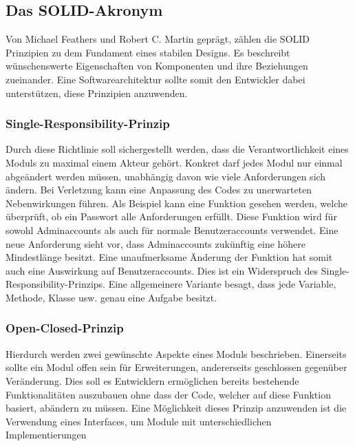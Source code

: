 \documentclass[conference]{IEEEtran}
\begin{document}
\subsection{Das SOLID-Akronym}

Von Michael Feathers und Robert C. Martin geprägt, zählen die SOLID Prinzipien zu dem Fundament eines stabilen Designs. Es beschreibt wünschenswerte Eigenschaften von Komponenten und ihre Beziehungen zueinander. Eine Softwarearchitektur sollte somit den Entwickler dabei unterstützen, diese Prinzipien anzuwenden. 

\subsubsection{Single-Responsibility-Prinzip} Durch diese Richtlinie soll sichergestellt werden, dass die Verantwortlichkeit eines Moduls zu maximal einem Akteur gehört. Konkret darf jedes Modul nur einmal abgeändert werden müssen, unabhängig davon wie viele Anforderungen sich ändern. Bei Verletzung kann eine Anpassung des Codes zu unerwarteten Nebenwirkungen führen. Als Beispiel kann eine Funktion gesehen werden, welche überprüft, ob ein Passwort alle Anforderungen erfüllt. Diese Funktion wird für sowohl Adminaccounts als auch für normale Benutzeraccounts verwendet. Eine neue Anforderung sieht vor, dass Adminaccounts zukünftig eine höhere Mindestlänge besitzt. Eine unaufmerksame Änderung der Funktion hat somit auch eine Auswirkung auf Benutzeraccounts. Dies ist ein Widerspruch des Single-Responsibility-Prinzips. Eine allgemeinere Variante besagt, dass jede Variable, Methode, Klasse usw. genau eine Aufgabe besitzt.

\subsubsection{Open-Closed-Prinzip} Hierdurch werden zwei gewünschte Aspekte eines Moduls beschrieben. Einerseits sollte ein Modul offen sein für Erweiterungen, andererseits geschlossen gegenüber Veränderung. Dies soll es Entwicklern ermöglichen bereits bestehende Funktionalitäten auszubauen ohne dass der Code, welcher auf diese Funktion basiert, abändern zu müssen. Eine Möglichkeit dieses Prinzip anzuwenden ist die Verwendung eines Interfaces, um Module mit unterschiedlichen Implementierungen  
\end{document}
